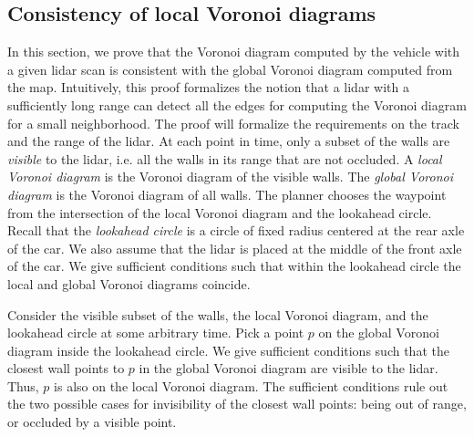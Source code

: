 \subsection{Consistency of local Voronoi diagrams}
\label{sec:localVoronoi}

In this section, we prove that the Voronoi diagram computed by the vehicle with a given lidar scan is consistent with the global Voronoi diagram computed from the map.
%
%
%
Intuitively, this proof formalizes the notion that a lidar with a sufficiently long range can detect all the edges for computing the Voronoi diagram for a small neighborhood.
%
The proof will formalize the requirements on the track and the range of the lidar.
%
At each point in time, only a subset of the walls are \emph{visible} to the lidar, i.e. all the walls in its range that are not occluded.
%
A \emph{local Voronoi diagram} is the Voronoi diagram of the visible walls.
%
The \emph{global Voronoi diagram} is the Voronoi diagram of all walls.
%
%
%
The planner chooses the waypoint from the intersection of the local Voronoi diagram and the lookahead circle.
%
Recall that the \emph{lookahead circle} is a circle of fixed radius centered at the rear axle of the car.
%
We also assume that the lidar is placed at the middle of the front axle of the car.
%
We give sufficient conditions such that within the lookahead circle the local and global Voronoi diagrams coincide.
%

Consider the visible subset of the walls, the local Voronoi diagram, and the lookahead circle at some arbitrary time.
%
Pick a point $p$ on the global Voronoi diagram inside the lookahead circle.
%
We give sufficient conditions such that the closest wall points to $p$ in the global Voronoi diagram are visible to the lidar. 
%
Thus, $p$ is also on the local Voronoi diagram.
%
The sufficient conditions rule out the two possible cases for invisibility of the closest wall points: being out of range, or occluded by a visible point.

